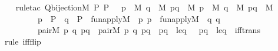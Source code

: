 \begin{isabellebody}
\ \ \isamarkupfalse%
{\isacharparenleft}{\kern0pt}rule{\isacharunderscore}{\kern0pt}tac\ Q{\isacharequal}{\kern0pt}{\isachardoublequoteopen}bijection{\isacharparenleft}{\kern0pt}{\isacharhash}{\kern0pt}{\isacharhash}{\kern0pt}M{\isacharcomma}{\kern0pt}\ P{\isacharcomma}{\kern0pt}\ P{\isacharcomma}{\kern0pt}\ {\isasympi}{\isacharparenright}{\kern0pt}\ {\isasymand}\ {\isacharparenleft}{\kern0pt}{\isasymforall}p\ {\isasymin}\ M{\isachardot}{\kern0pt}\ {\isasymforall}q\ {\isasymin}\ M{\isachardot}{\kern0pt}\ {\isasymforall}p{\isacharunderscore}{\kern0pt}q\ {\isasymin}\ M{\isachardot}{\kern0pt}\ {\isasymforall}{\isasympi}p\ {\isasymin}\ M{\isachardot}{\kern0pt}\ {\isasymforall}{\isasympi}q\ {\isasymin}\ M{\isachardot}{\kern0pt}\ {\isasymforall}{\isasympi}p{\isacharunderscore}{\kern0pt}{\isasympi}q\ {\isasymin}\ M{\isachardot}{\kern0pt}\ \isanewline
\ \ \ \ \ \ \ \ p\ {\isasymin}\ P\ {\isasymlongrightarrow}\ q\ {\isasymin}\ P\ {\isasymlongrightarrow}\ fun{\isacharunderscore}{\kern0pt}apply{\isacharparenleft}{\kern0pt}{\isacharhash}{\kern0pt}{\isacharhash}{\kern0pt}M{\isacharcomma}{\kern0pt}\ {\isasympi}{\isacharcomma}{\kern0pt}\ p{\isacharcomma}{\kern0pt}\ {\isasympi}p{\isacharparenright}{\kern0pt}\ {\isasymlongrightarrow}\ fun{\isacharunderscore}{\kern0pt}apply{\isacharparenleft}{\kern0pt}{\isacharhash}{\kern0pt}{\isacharhash}{\kern0pt}M{\isacharcomma}{\kern0pt}\ {\isasympi}{\isacharcomma}{\kern0pt}\ q{\isacharcomma}{\kern0pt}\ {\isasympi}q{\isacharparenright}{\kern0pt}\ {\isasymlongrightarrow}\isanewline
\ \ \ \ \ \ \ \ pair{\isacharparenleft}{\kern0pt}{\isacharhash}{\kern0pt}{\isacharhash}{\kern0pt}M{\isacharcomma}{\kern0pt}\ p{\isacharcomma}{\kern0pt}\ q{\isacharcomma}{\kern0pt}\ p{\isacharunderscore}{\kern0pt}q{\isacharparenright}{\kern0pt}\ {\isasymlongrightarrow}\ pair{\isacharparenleft}{\kern0pt}{\isacharhash}{\kern0pt}{\isacharhash}{\kern0pt}M{\isacharcomma}{\kern0pt}\ {\isasympi}p{\isacharcomma}{\kern0pt}\ {\isasympi}q{\isacharcomma}{\kern0pt}\ {\isasympi}p{\isacharunderscore}{\kern0pt}{\isasympi}q{\isacharparenright}{\kern0pt}\ {\isasymlongrightarrow}\ {\isacharparenleft}{\kern0pt}p{\isacharunderscore}{\kern0pt}q\ {\isasymin}\ leq\ \ {\isasymlongleftrightarrow}\ {\isasympi}p{\isacharunderscore}{\kern0pt}{\isasympi}q\ {\isasymin}\ leq{\isacharparenright}{\kern0pt}{\isacharparenright}{\kern0pt}{\isachardoublequoteclose}\ \ iff{\isacharunderscore}{\kern0pt}trans{\isacharparenright}{\kern0pt}\ \isanewline
\ \ \ \isamarkupfalse%
{\isacharparenleft}{\kern0pt}rule\ iff{\isacharunderscore}{\kern0pt}flip{\isacharparenright}{\kern0pt}\ \isanewline

\end{isabellebody}
